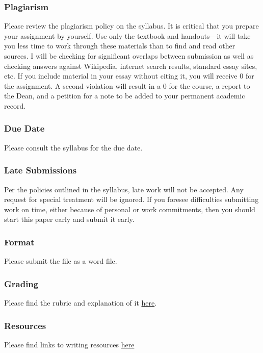 \documentclass[]{article}
\begin{document}
\subsubsection{Plagiarism}\label{plagiarism}

Please review the plagiarism policy on the syllabus. It is critical that
you prepare your assignment by yourself. Use only the textbook and
handouts---it will take you less time to work through these materials
than to find and read other sources. I will be checking for significant
overlaps between submission as well as checking answers against
Wikipedia, internet search results, standard essay sites, etc. If you
include material in your essay without citing it, you will receive 0 for
the assignment. A second violation will result in a 0 for the course, a
report to the Dean, and a petition for a note to be added to your
permanent academic record.

\subsubsection{Due Date}\label{due-date}

Please consult the syllabus for the due date.

\subsubsection{Late Submissions}\label{late-submissions}

Per the policies outlined in the syllabus, late work will not be
accepted. Any request for special treatment will be ignored. If you
foresee difficulties submitting work on time, either because of personal
or work commitments, then you should start this paper early and submit
it early.

\subsubsection{Format}\label{format}

Please submit the file as a word file.

\subsubsection{Grading}\label{grading}

Please find the rubric and explanation of it
\href{/Teaching/Grading/}{here}.

\subsubsection{Resources}\label{resources}

Please find links to writing resources \href{/Teaching/Resources/}{here}
\end{document}
